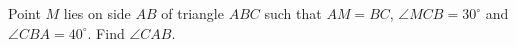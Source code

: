 Point $M$ lies on side $AB$ of triangle $ABC$ such that $AM=BC$, $\angle MCB=30^\circ$ and $\angle CBA=40^\circ$. Find $\angle CAB$.
